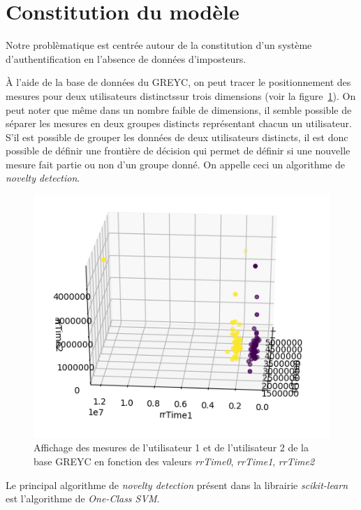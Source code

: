 \section{Constitution du modèle}

Notre problèmatique est centrée autour de la constitution d'un système d'authentification en l'absence de données d'imposteurs.

À l'aide de la base de données du GREYC, on peut tracer le positionnement des mesures pour deux utilisateurs distinctssur trois dimensions (voir la figure~\ref{3d}). On peut noter que même dans un nombre faible de dimensions, il semble possible de séparer les mesures en deux groupes distincts représentant chacun un utilisateur. S'il est possible de grouper les données de deux utilisateurs distincts, il est donc possible de définir une frontière de décision qui permet de définir si une nouvelle mesure fait partie ou non d'un groupe donné. On appelle ceci un algorithme de \textit{novelty detection}.

\begin{figure}[b]
    \centering
    \includegraphics[width=\linewidth]{res/3d.png}
    \caption{Affichage des mesures de l'utilisateur 1 et de l'utilisateur 2 de la base GREYC en fonction des valeurs \textit{rrTime0}, \textit{rrTime1}, \textit{rrTime2}}
    \label{3d}
\end{figure}

Le principal algorithme de \textit{novelty detection} présent dans la librairie \textit{scikit-learn} est l'algorithme de \textit{One-Class SVM}.

